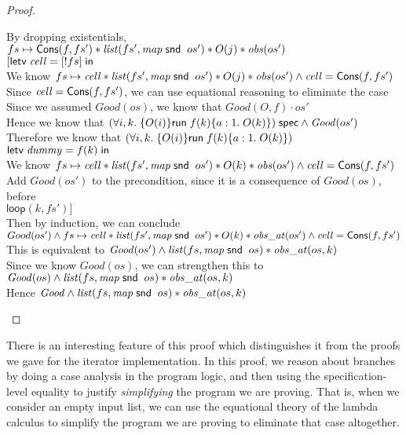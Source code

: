\begin{proof}
\begin{tabbedproof}
\ooo By dropping existentials, $fs \mapsto \mathsf{Cons}(f, fs') * \mathit{list}(fs',  \mathit{map}\;\mathsf{snd}\;\;os') * O(j) * \mathit{obs}( os')$ \\
\ooo $[\mathsf{letv}\;\mathit{cell} = [!fs]\;\mathsf{in}\;$ \\
\ooo We know $fs \mapsto \mathit{cell}  * \mathit{list}(fs',  \mathit{map}\;\mathsf{snd}\;\;os') * O(j) * \mathit{obs}( os') \land \mathit{cell} = \mathsf{Cons}(f, fs')$ \\
\ooo Since $\mathit{cell} = \mathsf{Cons}(f, fs')$, we can use equational reasoning to eliminate the case \\
\ooo Since we assumed $\mathit{Good}(os)$, we know that $\mathit{Good}{(O,f)\cdot os'}$ \\
\ooo Hence we know that ${(\forall i,k.\; \{{O(i)}\}{\mathsf{run}\;{f(k)}}\{{a:1}.\;{O(k)}\})}\;\mathsf{spec} \land \mathit{Good}(os')$ \\
\ooo Therefore we know that $(\forall i,k.\; \{{O(i)}\}{\mathsf{run}\;{f(k)}}\{{a:1}.\;{O(k)}\})$ \\
\ooo $\mathsf{letv}\;\mathit{dummy} = f(k)\;\mathsf{in}\;$ \\
\ooo We know $fs \mapsto \mathit{cell}  * \mathit{list}(fs',  \mathit{map}\;\mathsf{snd}\;\;os') * O(k) * \mathit{obs}( os') \land \mathit{cell} = \mathsf{Cons}(f, fs')$ \\
\ooo Add $\mathit{Good}(os')$ to the precondition, since it is a consequence of $\mathit{Good}(os)$, before\\
\ooo $\mathsf{loop}(k, fs')]$\\
\ooo Then by induction, we can conclude \\
\ooo $Good(os') \land fs \mapsto \mathit{cell}  * \mathit{list}(fs',  \mathit{map}\;\mathsf{snd}\;\;os') * O(k) * \mathit{obs\_at}( os') \land \mathit{cell} = \mathsf{Cons}(f, fs')$ \\
\ooo This is equivalent to $\mathit{Good}(os') \land \mathit{list}(fs, \mathit{map}\;\mathsf{snd}\;\;os) * \mathit{obs\_at}(os, k)$ \\
\ooo Since we know $\mathit{Good}(os)$, we can strengthen this to  \\
\ooo  $\mathit{Good}(os) \land \mathit{list}(fs, \mathit{map}\;\mathsf{snd}\;\;os) * \mathit{obs\_at}(os, k)$ \\
\oo Hence $\mathit{Good} \land \mathit{list}(fs, \mathit{map}\;\mathsf{snd}\;\;os) * \mathit{obs\_at}(os, k)$
\end{tabbedproof}
\end{proof}

There is an interesting feature of this proof which distinguishes it
from the proofs we gave for the iterator implementation. In this
proof, we reason about branches by doing a case analysis in the
program logic, and then using the specification-level equality to
justify \emph{simplifying} the program we are proving. That is, when
we consider an empty input list, we can use the equational theory of
the lambda calculus to simplify the program we are proving to
eliminate that case altogether.

